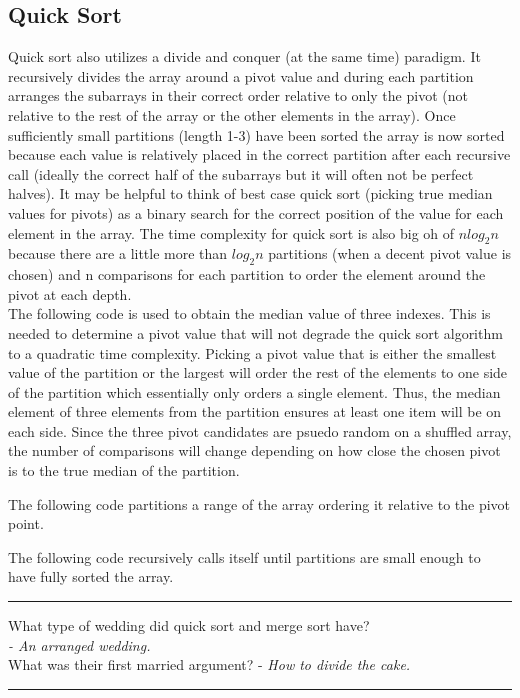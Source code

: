 \documentclass[letterpaper, 10pt]{article}
\begin{document}
\subsection{Quick Sort}
Quick sort also utilizes a divide and conquer (at the same time) paradigm. It recursively divides the array around
a pivot value and during each partition arranges the subarrays in their correct order relative to
only the pivot (not relative to the rest of the array or the other elements in the array). Once
sufficiently small partitions (length 1-3) have been sorted the array is now sorted because
each value is relatively placed in the correct partition after each recursive call 
(ideally the correct half of the subarrays but it will often not be perfect halves).
It may be helpful to think of best case quick sort (picking true median values for pivots)
as a binary search for the correct position of the value for each element in the array.
The time complexity for quick sort is also big oh of
\(nlog_2n\) because there are a little more than \(log_2n \) partitions 
(when a decent pivot value is chosen) and n comparisons for each partition to order the element around
the pivot at each depth.\\
\newline
The following code is used to obtain the median value of three indexes. This is needed to determine
a pivot value that will not degrade the quick sort algorithm to a quadratic time complexity. Picking 
a pivot value that is either the smallest value of the partition or the largest will order the rest 
of the elements to one side of the partition which essentially only orders a single element. Thus, the
median element of three elements from the partition ensures at least one item will be on each side.
Since the three pivot candidates are psuedo random on a shuffled array, the number of comparisons
will change depending on how close the chosen pivot is to the true median of the partition.

The following code partitions a range of the array ordering it relative to the pivot point.

The following code recursively calls itself until partitions are small enough to have
fully sorted the array.

\hrule
\vspace{.25cm}
What type of wedding did quick sort and merge sort have?\\ 
\indent\textit{- An arranged wedding.}\\
What was their first married argument? - \textit{How to divide the cake.}
\vspace{.25cm}
\hrule
\end{document}
